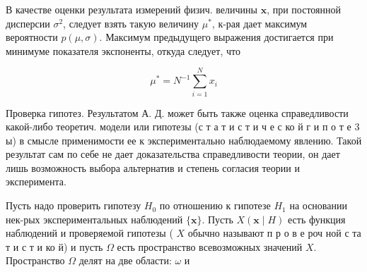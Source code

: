 \documentclass[10pt]{article}
\begin{document}
В качестве оценки результата измерений физич. величины $\boldsymbol{x}$, при постоянной дисперсии $\sigma^{2}$, следует взять такую величину $\mu^{*}$, к-рая дает максимум вероятности $p(\mu, \sigma)$. Максимум предыдущего выражения достигается при минимуме показателя экспоненты, откуда следует, что



\[

\mu^{*}=N^{-1} \sum_{i=1}^{N} x_{i}

\]



Проверка гипотез. Результатом А. Д. может быть также оценка справедливости какой-либо теоретич. модели или гипотезы (с т а т и с т и ч е с ко й г и п о т е 3 ы) в смысле применимости ее к экспериментально наблюдаемому явлению. Такой результат сам по себе не дает доказательства справедливости теории, он дает лишь возможность выбора альтернатив и степень согласия теории и эксперимента.



Пусть надо проверить гипотезу $H_{0}$ по отношению к гипотезе $H_{1}$ на основании нек-рых экспериментальных наблюдений $\{\boldsymbol{x}\}$. Пусть $X(\boldsymbol{x} \mid H)$ есть функция наблюдений и проверяемой гипотезы ( $X$ обычно называют п р о в е роч ной с та т и с т и ко й) и пусть $\Omega$ есть пространство всевозможных значений $X$. Пространство $\Omega$ делят на две области: $\omega$ и
\end{document}
